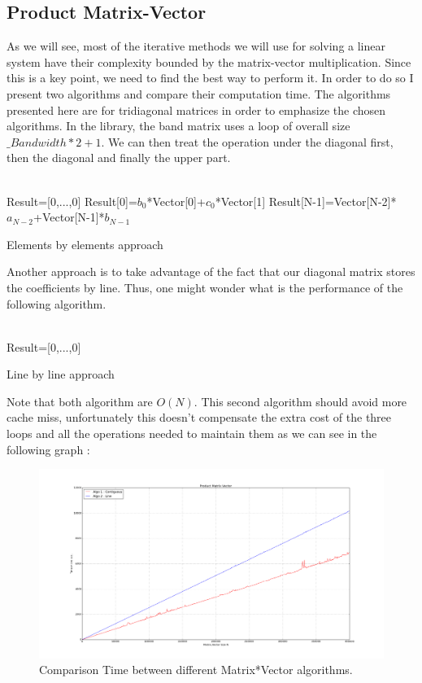 \documentclass[a4paper]{report}
\begin{document}
\subsection{Product Matrix-Vector}
As we will see, most of the iterative methods we will use for solving a linear system have their complexity bounded by the matrix-vector multiplication. Since this is a key point, we need to find the best way to perform it. In order to do so I present two algorithms and compare their computation time. The algorithms presented here are for tridiagonal matrices in order to emphasize the chosen algorithms. In the library, the band matrix uses a loop of overall size $\_Bandwidth*2+1$. We can then treat the operation under the diagonal first, then the diagonal and finally the upper part.
\\
\\
\begin{algorithm}[H]
 Result=[0,...,0]\;
 Result[0]=$b_0$*Vector[0]+$c_0$*Vector[1]\;
 Result[N-1]=Vector[N-2]*$a_{N-2}$+Vector[N-1]*$b_{N-1}$\;
 \caption{Elements by elements approach}
\end{algorithm}
Another approach is to take advantage of the fact that our diagonal matrix stores the coefficients by line. Thus, one might wonder what is the performance of the following algorithm.
\\
\\
\begin{algorithm}[H]
 Result=[0,...,0]\;
 \caption{Line by line approach}
\end{algorithm}
Note that both algorithm are $O(N)$.
This second algorithm should avoid more cache miss, unfortunately this doesn't compensate the extra cost of the three loops and all the operations needed to maintain them as we can see in the following graph :

\begin{figure}[H]
\begin{center}
\includegraphics[scale=0.20]{prod_time.png}\caption{Comparison Time between different Matrix*Vector algorithms.}
\end{center}
\end{figure}
\end{document}
